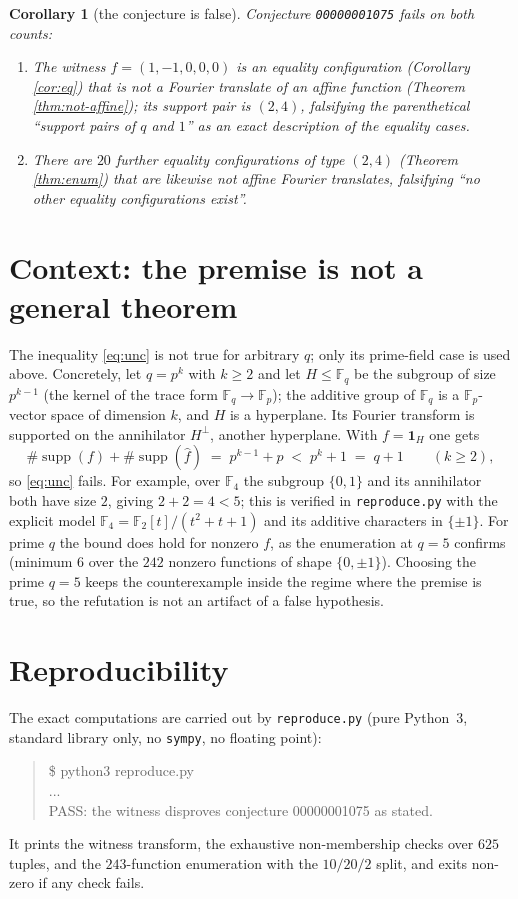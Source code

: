 \documentclass[11pt]{article}
\newtheorem{corollary}[theorem]{Corollary}
\theoremstyle{definition}
\theoremstyle{remark}
\newcommand{\F}{\mathbb{F}}
\newcommand{\supp}{\operatorname{supp}}
\newcommand{\fh}{\widehat{f}}
\begin{document}
\begin{corollary}[the conjecture is false]
Conjecture \texttt{00000001075} fails on both counts:
\begin{enumerate}
\item The witness $f=(1,-1,0,0,0)$ is an equality configuration (Corollary
\ref{cor:eq}) that is not a Fourier translate of an affine function (Theorem
\ref{thm:not-affine}); its support pair is $(2,4)$, falsifying the
parenthetical ``support pairs of $q$ and $1$'' as an exact description of the
equality cases.
\item There are $20$ further equality configurations of type $(2,4)$
(Theorem \ref{thm:enum}) that are likewise not affine Fourier translates,
falsifying ``no other equality configurations exist''.
\end{enumerate}
\end{corollary}

\section{Context: the premise is not a general theorem}

The inequality \eqref{eq:unc} is not true for arbitrary $q$; only its
prime-field case is used above. Concretely, let $q=p^k$ with $k\ge2$ and let
$H\le\F_q$ be the subgroup of size $p^{k-1}$ (the kernel of the trace form
$\F_q\to\F_p$); the additive group of $\F_q$ is a $\F_p$-vector space of
dimension $k$, and $H$ is a hyperplane. Its Fourier transform is supported on
the annihilator $H^\perp$, another hyperplane. With $f=\mathbf{1}_H$ one gets
\[
\#\supp(f)+\#\supp(\fh) \;=\; p^{k-1}+p \;<\; p^k+1 \;=\; q+1
\qquad(k\ge2),
\]
so \eqref{eq:unc} fails. For example, over $\F_4$ the subgroup
$\{0,1\}$ and its annihilator both have size $2$, giving $2+2=4<5$; this is
verified in \texttt{reproduce.py} with the explicit model
$\F_4=\F_2[t]/(t^2+t+1)$ and its additive characters in $\{\pm1\}$. For prime
$q$ the bound does hold for nonzero $f$, as the enumeration at $q=5$ confirms
(minimum $6$ over the $242$ nonzero functions of shape $\{0,\pm1\}$).
Choosing the prime $q=5$ keeps the counterexample inside the regime where the
premise is true, so the refutation is not an artifact of a false hypothesis.

\section{Reproducibility}

The exact computations are carried out by \texttt{reproduce.py} (pure
Python~3, standard library only, no \texttt{sympy}, no floating point):
\begin{quote}\ttfamily
\$ python3 reproduce.py\\
...\\
PASS: the witness disproves conjecture 00000001075 as stated.
\end{quote}
It prints the witness transform, the exhaustive non-membership checks over
$625$ tuples, and the $243$-function enumeration with the $10/20/2$ split, and
exits non-zero if any check fails.
\end{document}
